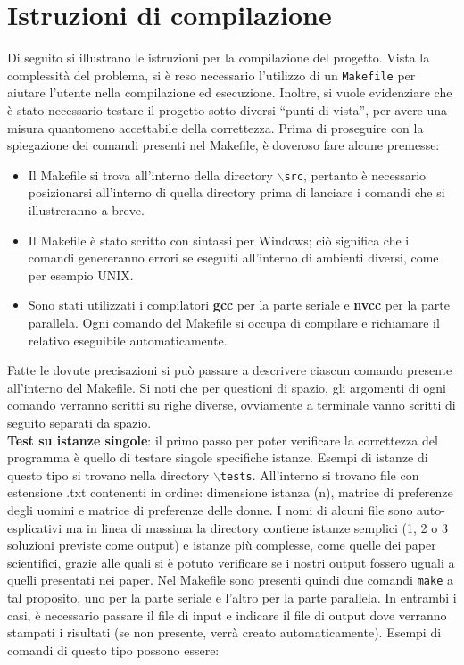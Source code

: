 \documentclass[12pt]{article}
\newcommand{\virg}[1]{``#1''}
\begin{document}
\pagebreak

\section{Istruzioni di compilazione}
    Di seguito si illustrano le istruzioni per la compilazione del progetto. Vista la complessità del problema, si è reso necessario l'utilizzo di un \texttt{Makefile} per aiutare l'utente nella compilazione ed esecuzione. Inoltre, si vuole evidenziare che è stato necessario testare il progetto sotto diversi \virg{punti di vista}, per avere una misura quantomeno accettabile della correttezza. Prima di proseguire con la spiegazione dei comandi presenti nel Makefile, è doveroso fare alcune premesse:

    \begin{itemize}
        \item Il Makefile si trova all'interno della directory \texttt{$\backslash$src}, pertanto è necessario posizionarsi all'interno di quella directory prima di lanciare i comandi che si illustreranno a breve. 
        \item Il Makefile è stato scritto con sintassi per Windows; ciò significa che i comandi genereranno errori se eseguiti all'interno di ambienti diversi, come per esempio UNIX.
        \item Sono stati utilizzati i compilatori \textbf{gcc} per la parte seriale e \textbf{nvcc} per la parte parallela. Ogni comando del Makefile si occupa di compilare e richiamare il relativo eseguibile automaticamente.
    \end{itemize}

    Fatte le dovute precisazioni si può passare a descrivere ciascun comando presente all'interno del Makefile. Si noti che per questioni di spazio, gli argomenti di ogni comando verranno scritti su righe diverse, ovviamente a terminale vanno scritti di seguito separati da spazio.\\

    \textbf{Test su istanze singole}: il primo passo per poter verificare la correttezza del programma è quello di testare singole specifiche istanze. Esempi di istanze di questo tipo si trovano nella directory \texttt{$\backslash$tests}. All'interno si trovano file con estensione .txt contenenti in ordine: dimensione istanza (n), matrice di preferenze degli uomini e matrice di preferenze delle donne. I nomi di alcuni file sono auto-esplicativi ma in linea di massima la directory contiene istanze semplici (1, 2 o 3 soluzioni previste come output) e istanze più complesse, come quelle dei paper scientifici, grazie alle quali si è potuto verificare se i nostri output fossero uguali a quelli presentati nei paper. Nel Makefile sono presenti quindi due comandi \texttt{make} a tal proposito, uno per la parte seriale e l'altro per la parte parallela. In entrambi i casi, è necessario passare il file di input e indicare il file di output dove verranno stampati i risultati (se non presente, verrà creato automaticamente). Esempi di comandi di questo tipo possono essere:
\end{document}
